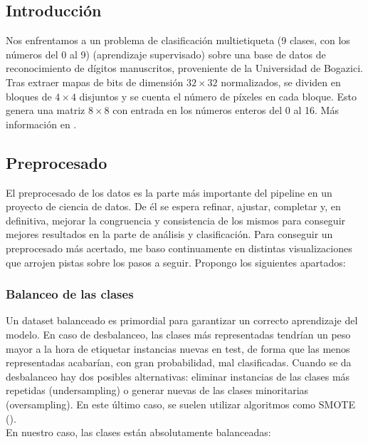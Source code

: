 \subsection{Introducción}

Nos enfrentamos a un problema de clasificación multietiqueta (9 clases, con los números del 0 al 9) (aprendizaje supervisado) sobre una base de datos de reconocimiento de dígitos manuscritos, proveniente de la Universidad de Bogazici. Tras extraer mapas de bits de dimensión $32\times32$ normalizados, se dividen en bloques de $4\times4$ disjuntos y se cuenta el número de píxeles en cada bloque. Esto genera una matriz $8\times8$ con entrada en los números enteros del 0 al 16. Más información en \cite{optdigits.names}. 

\subsection{Preprocesado}

El preprocesado de los datos es la parte más importante del pipeline en un proyecto de ciencia de datos. De él se espera refinar, ajustar, completar y, en definitiva, mejorar la congruencia y consistencia de los mismos para conseguir mejores resultados en la parte de análisis y clasificación. Para conseguir un preprocesado más acertado, me baso continuamente en distintas visualizaciones que arrojen pistas sobre los pasos a seguir. Propongo los siguientes apartados:

\subsubsection{Balanceo de las clases} 

Un dataset balanceado es primordial para garantizar un correcto aprendizaje del modelo. En caso de desbalanceo, las clases más representadas tendrían un peso mayor a la hora de etiquetar instancias nuevas en test, de forma que las menos representadas acabarían, con gran probabilidad, mal clasificadas. Cuando se da desbalanceo hay dos posibles alternativas: eliminar instancias de las clases más repetidas (undersampling) o generar nuevas de las clases minoritarias (oversampling). En este último caso, se suelen utilizar algoritmos como SMOTE (\cite{smote}). \\

En nuestro caso, las clases están absolutamente balanceadas:

